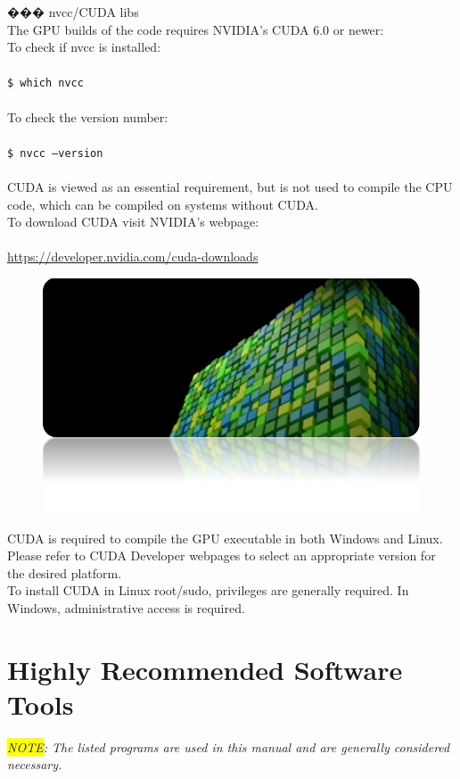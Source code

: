 \begin{easylist}[articletoc]
��� nvcc/CUDA libs\\
The GPU builds of the code requires NVIDIA's CUDA 6.0 or newer:\\
To check if nvcc is installed:\\\\
\texttt{\$ which nvcc}\\\\
To check the version number:\\\\
\texttt{\$ nvcc --version}\\\\
CUDA is viewed as an essential requirement, but is not used to compile the CPU code, which can be compiled on systems without CUDA.\\
To download CUDA visit NVIDIA's webpage:\\\\
\url{https://developer.nvidia.com/cuda-downloads}
\begin{figure}[H]
\centering
\includegraphics[scale=0.6]{images/cuda}
\end{figure}
CUDA is required to compile the GPU executable in both Windows and Linux.  Please refer to CUDA Developer webpages to select an appropriate version for the desired platform.\\
To install CUDA in Linux root/sudo, privileges are generally required.  In Windows, administrative access is required.
\end{easylist}

\section{Highly Recommended Software Tools}
\textit{\colorbox{yellow}{NOTE}: The listed programs are used in this manual and are generally considered necessary.}
